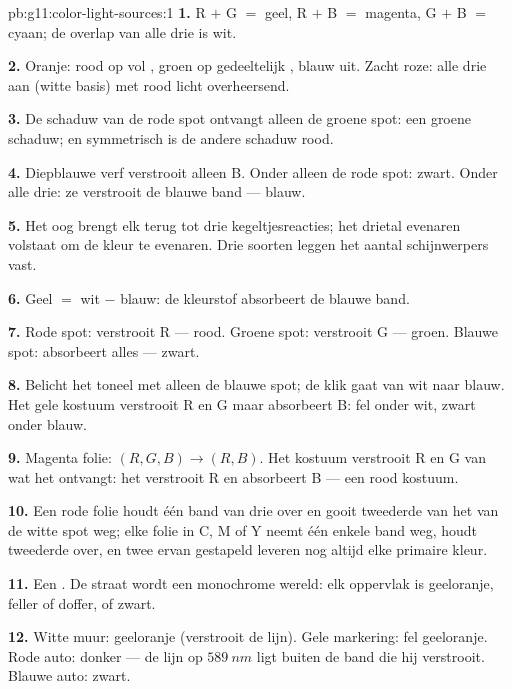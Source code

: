 \begin{solution}{pb:g11:color-light-sources:1}
\textbf{1.} R $+$ G $=$ geel, R $+$ B $=$ magenta, G $+$ B $=$ cyaan; de
overlap van alle drie is wit.

\textbf{2.} Oranje: rood op vol , groen op gedeeltelijk
, blauw uit. Zacht roze: alle drie aan (witte basis) met rood
licht overheersend.

\textbf{3.} De schaduw van de rode spot ontvangt alleen de groene spot:
een groene schaduw; en symmetrisch is de andere schaduw rood.

\textbf{4.} Diepblauwe verf verstrooit alleen B. Onder alleen de rode
spot: zwart. Onder alle drie: ze verstrooit de blauwe band --- blauw.

\textbf{5.} Het oog brengt elk  terug tot drie
kegeltjesreacties; het drietal evenaren volstaat om de kleur te
evenaren. Drie soorten  leggen het aantal schijnwerpers vast.

\textbf{6.} Geel $=$ wit $-$ blauw: de kleurstof absorbeert de blauwe
band.

\textbf{7.} Rode spot: verstrooit R --- rood. Groene spot: verstrooit G
--- groen. Blauwe spot: absorbeert alles --- zwart.

\textbf{8.} Belicht het toneel met alleen de blauwe spot; de klik gaat
van wit naar blauw. Het gele kostuum verstrooit R en G maar absorbeert
B: fel onder wit, zwart onder blauw.

\textbf{9.} Magenta folie: $(R, G, B) \to (R, B)$. Het kostuum
verstrooit R en G van wat het ontvangt: het verstrooit R en absorbeert B
--- een rood kostuum.

\textbf{10.} Een rode folie houdt één band van drie over en gooit
tweederde van het  van de witte spot weg; elke folie in C, M of
Y neemt één enkele band weg, houdt tweederde over, en twee ervan
gestapeld leveren nog altijd elke primaire kleur.

\textbf{11.} Een . De straat wordt een monochrome
wereld: elk oppervlak is geeloranje, feller of doffer, of zwart.

\textbf{12.} Witte muur: geeloranje (verstrooit de lijn). Gele
markering: fel geeloranje. Rode auto: donker --- de lijn op
$\qty{589}{nm}$ ligt buiten de band die hij verstrooit. Blauwe auto:
zwart.


\end{solution}
